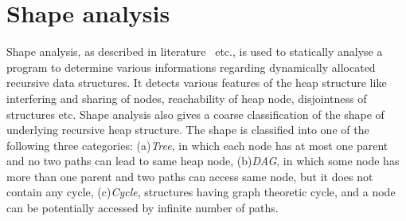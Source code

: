 \section{Shape analysis}
Shape analysis, as described in literature~\cite{Sagiv99Parametric, Sagiv02parametric, Ghiya96, Sagiv96solvingshape-analysis, Mooly} etc., is used to statically analyse a program to determine various 
informations regarding dynamically allocated recursive 
data structures. It detects various features of the heap structure like interfering and 
sharing of nodes, reachability of heap node, disjointness of structures etc. 
Shape analysis also gives a coarse classification of the shape of underlying recursive heap structure. The shape is classified into one of the 
following three categories: (a)\emph{Tree}, 
in which each node has at most one parent and no two paths can lead to 
same heap node, (b)\emph{DAG}, in which some node has more than one parent 
and two paths can access same node, but it does not contain any cycle, 
(c)\emph{Cycle}, structures having graph theoretic cycle, and a node can be 
potentially accessed by infinite number of paths.

